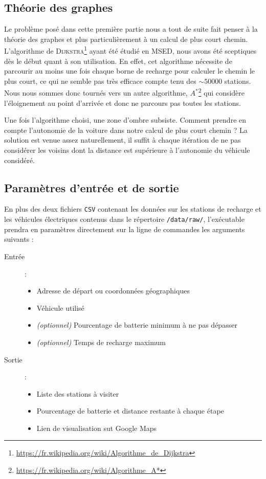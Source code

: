 \documentclass[a4paper, 12pt]{report}
\begin{document}
\subsection{Théorie des graphes}
Le problème posé dans cette première partie nous a tout de suite fait penser à la théorie des graphes et plus particulièrement à un calcul de plus court chemin. L'algorithme de \textsc{Dijkstra}\footnote{\url{https://fr.wikipedia.org/wiki/Algorithme_de_Dijkstra}} ayant été étudié en MSED, nous avons été sceptiques dès le début quant à son utilisation. En effet, cet algorithme nécessite de parcourir au moins une fois chaque borne de recharge pour calculer le chemin le plus court, ce qui ne semble pas très efficace compte tenu des $\sim50 000$ stations. Nous nous sommes donc tournés vers un autre algorithme, $A^*$\footnote{\url{https://fr.wikipedia.org/wiki/Algorithme_A*}} qui considère l'éloignement au point d'arrivée et donc ne parcours pas toutes les stations.\par\bigskip
Une fois l'algorithme choisi, une zone d'ombre subsiste. Comment prendre en compte l'autonomie de la voiture dans notre calcul de plus court chemin ? La solution est venue assez naturellement, il suffit à chaque itération de ne pas considérer les voisins dont la distance est supérieure à l'autonomie du véhicule considéré.
\subsection{Paramètres d'entrée et de sortie}
En plus des deux fichiers \texttt{CSV} contenant les données sur les stations de recharge et les véhicules électriques contenus dans le répertoire \texttt{/data/raw/}, l'exécutable prendra en paramètres directement sur la ligne de commandes les arguments suivants :
\begin{description}
    \item[Entrée] :
        \begin{itemize}
            \item Adresse de départ ou coordonnées géographiques
            \item Véhicule utilisé
            \item \textit{(optionnel)} Pourcentage de batterie minimum à ne pas dépasser
            \item \textit{(optionnel)} Temps de recharge maximum
        \end{itemize}
    \item[Sortie] :
        \begin{itemize}
            \item Liste des stations à visiter
            \item Pourcentage de batterie et distance restante à chaque étape
            \item Lien de visualisation sut Google Maps
        \end{itemize}
\end{description}
\clearpage
\end{document}
